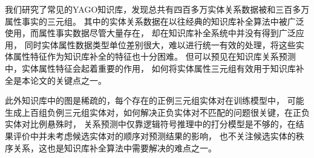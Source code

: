 我们研究了常见的YAGO知识库，发现总共有四百多万实体关系数据被和三百多万属性事实的三元组。
其中的实体关系数据在以往经典的知识库补全算法中被广泛使用，而属性事实数据尽管大量存在，
却在知识库补全系统中并没有得到广泛应用，
同时实体属性数据类型单位差别很大，难以进行统一有效的处理，将这些实体属性特征作为知识库补全的特征也十分困难。
但可以预见在知识库关系预测中，实体属性特征会起着重要的作用，
如何将实体属性三元组有效用于知识库补全是本论文的关键点之一。

此外知识库中的图是稀疏的，每个存在的正例三元组实体对在训练模型中，
可能生成上百组负例三元组实体对，如何解决正负实体对不匹配的问题很关键，在正负实体对比例悬殊时，
关系预测中仅靠逻辑符号推理中的打分模型是不够的，在结果评价中并未考虑候选实体对的顺序对预测结果的影响，
也不关注候选实体的秩序关系，这也是知识库补全算法中需要解决的难点之一。

